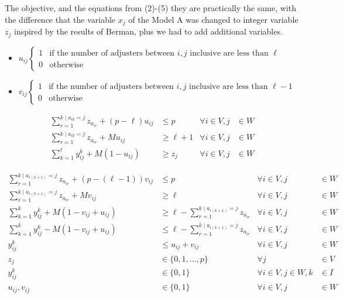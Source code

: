 \begin{frame}[allowframebreaks]
  The objective, and the equations from (2)-(5) they are practically the same,
  with the difference that the variable $x_j$ of the Model A
  was changed to integer variable $z_j$ inspired by the results of Berman,
  plus we had to add additional variables.
  {\small
    \begin{itemize}
    \item $u_{ij} \begin{cases} 1 & \mbox{if the number of adjusters between } i,j \mbox{ inclusive are less than } \ell \\
      0 & \mbox{otherwise}
    \end{cases}$
    \item $v_{ij}\begin{cases} 1 & \mbox{if the number of adjusters between } i,j \mbox{ inclusive are less than } \ell - 1 \\
      0 & \mbox{otherwise}
    \end{cases}$
    \end{itemize}
  }

{\footnotesize
  \begin{align}
    \sum_{r = 1}^{k \mid a_{ik}=j}{z_{a_{ir}}} + (p-\ell) u_{ij} & \leq p & \forall i \in V, j &\in W \\
    \sum_{r = 1}^{k \mid a_{ik}=j}{z_{a_{ir}}} + M u_{ij} & \geq \ell+1   & \forall i \in V, j &\in W \\
    \sum_{k = 1}^{\ell}{y_{ij}^{k}} + M (1 - u_{ij}) & \geq z_j           & \forall i \in V, j &\in W
  \end{align}
  
  \begin{align}
    \sum_{r = 1}^{k \mid a_{i(k+1)}=j}{z_{a_{ir}}} + (p-(\ell-1)) v_{ij} & \leq p                                     & \forall i \in V, j &\in W\\
    \sum_{r = 1}^{k \mid a_{i(k+1)}=j}{z_{a_{ir}}} + M v_{ij}         & \geq \ell                                     & \forall i \in V, j &\in W\\
    \sum_{k=1}^{k}{y_{ij}^{k}} + M (1 - v_{ij} + u_{ij}) & \geq \ell - \sum_{r = 1}^{k \mid a_{i(k+1)}=j}{z_{a_{ir}}} & \forall i \in V, j &\in W\\
    \sum_{k=1}^{k}{y_{ij}^{k}} - M (1 - v_{ij} + u_{ij}) & \leq \ell - \sum_{r = 1}^{k \mid a_{i(k+1)}=j}{z_{a_{ir}}} & \forall i \in V, j &\in W\\
    y_{ij}^{k} & \leq u_{ij} + v_{ij}  &       \forall i \in V,j &\in W \\
    z_j & \in \{0,1,\ldots,p\}         &               \forall j &\in V \nonumber\\
    y_{ij}^{k} & \in \{0,1\}           & \forall i\in V,j\in W,k &\in I \nonumber\\
    u_{ij},v_{ij} & \in \{0,1\}        &       \forall i \in V,j &\in W \nonumber
  \end{align}
}
\end{frame}
